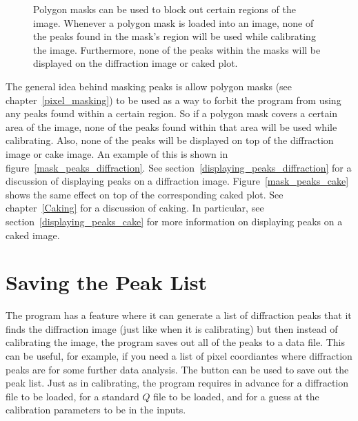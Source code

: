 \begin{figure}[htb]
    \caption{Polygon masks can be used to block
    out certain regions of the image. Whenever
    a polygon mask is loaded into an image, none
    of the peaks found in the mask's region will be
    used while calibrating the image. Furthermore,
    none of the peaks within the masks will be 
    displayed on the diffraction image or caked plot.}
    \label{mask_peaks}
\end{figure}

The general idea behind masking peaks is allow polygon 
masks (see chapter~\ref{pixel_masking}) to be used as 
a way to forbit the program from using any peaks found
within a certain region. So if a polygon mask covers a 
certain area of the image, none of the peaks found within that
area will be used while calibrating. Also, none of 
the peaks will be displayed on top of the diffraction 
image or cake image. An example of this is shown in
figure~\ref{mask_peaks_diffraction}. 
See section~\ref{displaying_peaks_diffraction}
for a discussion of displaying peaks on a diffraction
image.
Figure~\ref{mask_peaks_cake} shows the same effect on
top of the corresponding caked plot. See 
chapter~\ref{Caking} for a discussion of caking.
In particular, see section~\ref{displaying_peaks_cake} 
for more information on displaying peaks on a caked
image.

\section{Saving the Peak List}

The program has a feature where it can generate
a list of diffraction peaks that it finds the 
diffraction image (just like when it is calibrating)
but then instead of calibrating the image, the program
saves out all of the peaks to a data file. This can
be useful, for example, if you need a list of pixel 
coordiantes where diffraction peaks are for some further
data analysis. The  button can
be used to save out the peak list. Just as in calibrating,
the program requires in advance for a diffraction file to
be loaded, for a standard $Q$ file to be loaded, and for
a guess at the calibration parameters to be in the inputs.

